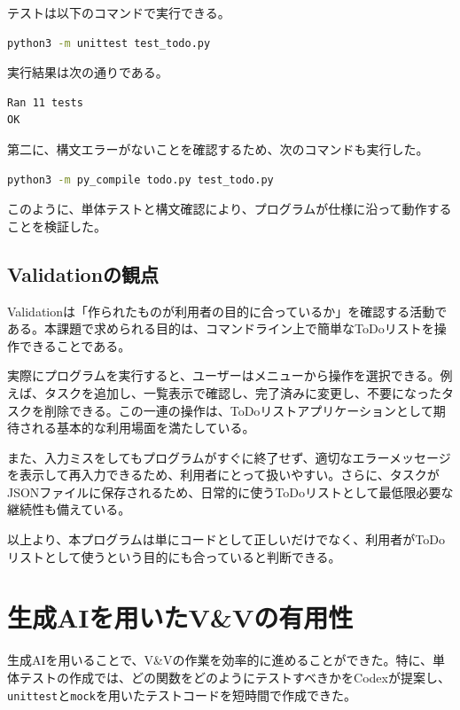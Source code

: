 \documentclass[uplatex,a4paper,11pt]{jsarticle}
\begin{document}
テストは以下のコマンドで実行できる。

\begin{lstlisting}[language=bash]
python3 -m unittest test_todo.py
\end{lstlisting}

実行結果は次の通りである。

\begin{lstlisting}
Ran 11 tests
OK
\end{lstlisting}

第二に、構文エラーがないことを確認するため、次のコマンドも実行した。

\begin{lstlisting}[language=bash]
python3 -m py_compile todo.py test_todo.py
\end{lstlisting}

このように、単体テストと構文確認により、プログラムが仕様に沿って動作することを検証した。

\subsection{Validationの観点}

Validationは「作られたものが利用者の目的に合っているか」を確認する活動である。本課題で求められる目的は、コマンドライン上で簡単なToDoリストを操作できることである。

実際にプログラムを実行すると、ユーザーはメニューから操作を選択できる。例えば、タスクを追加し、一覧表示で確認し、完了済みに変更し、不要になったタスクを削除できる。この一連の操作は、ToDoリストアプリケーションとして期待される基本的な利用場面を満たしている。

また、入力ミスをしてもプログラムがすぐに終了せず、適切なエラーメッセージを表示して再入力できるため、利用者にとって扱いやすい。さらに、タスクがJSONファイルに保存されるため、日常的に使うToDoリストとして最低限必要な継続性も備えている。

以上より、本プログラムは単にコードとして正しいだけでなく、利用者がToDoリストとして使うという目的にも合っていると判断できる。

\section{生成AIを用いたV\&Vの有用性}

生成AIを用いることで、V\&Vの作業を効率的に進めることができた。特に、単体テストの作成では、どの関数をどのようにテストすべきかをCodexが提案し、\texttt{unittest}と\texttt{mock}を用いたテストコードを短時間で作成できた。
\end{document}
